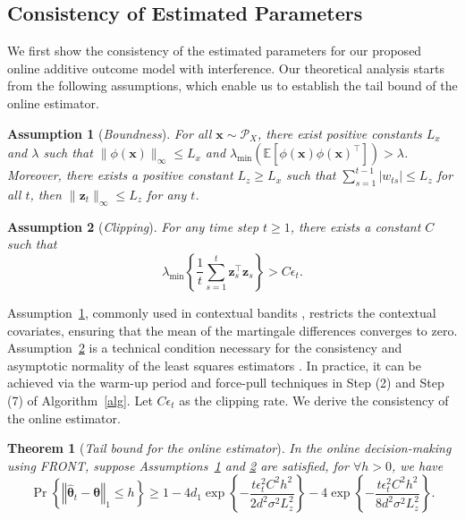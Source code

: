 \documentclass[12pt]{article}
\newtheorem{theorem}{Theorem}
\newtheorem{assumption}{Assumption}[section]
\begin{document}
\subsection{Consistency of Estimated Parameters}
\label{sec:consistency}

We first show the consistency of the estimated parameters for our proposed online
additive outcome model with interference. Our theoretical analysis starts from the following assumptions, which enable us to establish the tail bound of the online estimator.

\begin{assumption}[{\emph{Boundness}}]
\label{ass:bound}
For all $\bm{x} \sim \mathcal{P}_X$, there exist positive constants $L_x$ and $\lambda$ such that $ \|\phi(\bm{x})\|_{\infty} \le L_x $ and $\lambda_{\min}\!\left(\mathbb{E}[\phi(\bm{x}) \phi(\bm{x})^{\top}]\right) > \lambda$. Moreover, there exists a positive constant $L_z \ge L_x$ such that $\sum_{s=1}^{t-1} \big|w_{ts}\big| \le L_z$ for all $t$, then $\|\bm{z}_t\|_{\infty} \le L_z$ for any $t$.
\end{assumption} 
\begin{assumption}[{\emph{Clipping}}]
\label{ass:mineigen}
For any time step $t \ge 1$, there exists a constant $C$ such that
\begin{equation*}
    \lambda_{\min}\left\{\frac{1}{t} \sum_{s=1}^t \bm{z}_s^{\top} \bm{z}_s \right\} > C\epsilon_t.
\end{equation*}
\end{assumption}

Assumption~\ref{ass:bound}, commonly used in contextual bandits \citep{zhang2020, chen2021, shen2024}, restricts the contextual covariates, ensuring that the mean of the martingale differences converges to zero. Assumption~\ref{ass:mineigen} is a technical condition necessary for the consistency and asymptotic normality of the least squares estimators \citep{deshpande2018,zhang2020,hadad2021,shen2024}. In practice, it can be achieved via the warm-up period and force-pull techniques in Step (2) and Step (7) of Algorithm~\ref{alg}. Let $C\epsilon_t$ as the clipping rate. We derive the consistency of the online estimator. 

\begin{theorem}[{\emph{Tail bound for the online estimator}}]
\label{theor:tail}
In the online decision-making using FRONT, suppose Assumptions~\ref{ass:bound} and \ref{ass:mineigen} are satisfied, for $\forall h > 0$, we have 
\begin{equation}
    \Pr\left\{\left\Vert  \widehat{\bm{\theta}}_{t} - \bm{\theta} \right\Vert_1 \le h \right\}\ge 1- 4d_1 \exp \left\{-\frac{t\epsilon_t^2 C^2 h^2}{2d^2\sigma^2 L_z^2}\right\} - 4\exp \left\{-\frac{t\epsilon_t^2 C^2 h^2}{8d^2\sigma^2 L_z^2}\right\}.
\end{equation}
\end{theorem}
\end{document}
